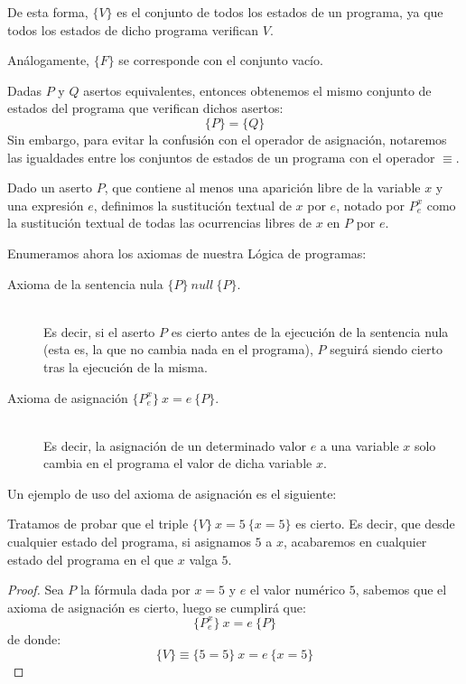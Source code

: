 De esta forma, $\{V\}$ es el conjunto de todos los estados de un programa, ya que todos los estados de dicho programa verifican $V$.

Análogamente, $\{F\}$ se corresponde con el conjunto vacío.\\

\begin{notacion}
    Dadas $P$ y $Q$ asertos equivalentes, entonces obtenemos el mismo conjunto de estados del programa que verifican dichos asertos:
    \begin{equation*}
        \{P\} = \{Q\}
    \end{equation*}
    Sin embargo, para evitar la confusión con el operador de asignación, notaremos las igualdades entre los conjuntos de estados de un programa con el operador $\equiv$.
\end{notacion}

\begin{definicion}
    Dado un aserto $P$, que contiene al menos una aparición libre de la variable $x$ y una expresión $e$, definimos la sustitución textual de $x$ por $e$, notado por $P_e^x$ como la sustitución textual de todas las ocurrencias libres de $x$ en $P$ por $e$.
\end{definicion}

Enumeramos ahora los axiomas de nuestra Lógica de programas:
\begin{description}
    \item [Axioma de la sentencia nula $\{P\}\ null\ \{P\}$.]~\\
        Es decir, si el aserto $P$ es cierto antes de la ejecución de la sentencia nula (esta es, la que no cambia nada en el programa), $P$ seguirá siendo cierto tras la ejecución de la misma.
    \item [Axioma de asignación $\{P_e^x\}\ x=e\ \{P\}$.]~\\
        Es decir, la asignación de un determinado valor $e$ a una variable $x$ solo cambia en el programa el valor de dicha variable $x$.
\end{description}

\begin{ejemplo}
    Un ejemplo de uso del axioma de asignación es el siguiente:

    Tratamos de probar que el triple $\{V\}\ x=5\ \{x=5\}$ es cierto. Es decir, que desde cualquier estado del programa, si asignamos $5$ a $x$, acabaremos en cualquier estado del programa en el que $x$ valga $5$.
    \begin{proof}
        Sea $P$ la fórmula dada por $x=5$ y $e$ el valor numérico $5$, sabemos que el axioma de asignación es cierto, luego se cumplirá que:
        \begin{equation*}
            \{P_e^x\}\ x=e\ \{P\}
        \end{equation*}
        de donde:
        \begin{equation*}
            \{V\} \equiv \{5=5\}\ x=e\ \{x=5\}
        \end{equation*}
        
    \end{proof}
\end{ejemplo}

